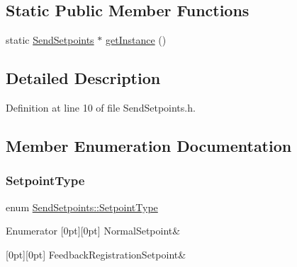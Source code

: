\subsection*{Static Public Member Functions}
\begin{DoxyCompactItemize}
\item 
static \hyperlink{class_send_setpoints}{Send\+Setpoints} $\ast$ \hyperlink{class_send_setpoints_ac69cc30ed614e18793b22ac9b63100fd}{get\+Instance} ()
\end{DoxyCompactItemize}


\subsection{Detailed Description}


Definition at line 10 of file Send\+Setpoints.\+h.



\subsection{Member Enumeration Documentation}
\mbox{\label{class_send_setpoints_a36f865e2cf8a800b6226ff7b6b03abcd}} 
\subsubsection{\texorpdfstring{Setpoint\+Type}{SetpointType}}
{\footnotesize\ttfamily enum \hyperlink{class_send_setpoints_a36f865e2cf8a800b6226ff7b6b03abcd}{Send\+Setpoints\+::\+Setpoint\+Type}}

\begin{DoxyEnumFields}{Enumerator}
[0pt][0pt]{}\mbox{\label{class_send_setpoints_a36f865e2cf8a800b6226ff7b6b03abcdaa68dfe27deefd92f0a1548a7478780dc}} 
Normal\+Setpoint&\\
\hline

[0pt][0pt]{}\mbox{\label{class_send_setpoints_a36f865e2cf8a800b6226ff7b6b03abcda8b11ecfc5573d2a58891d82542d7e52a}} 
Feedback\+Registration\+Setpoint&\\
\hline

\end{DoxyEnumFields}


